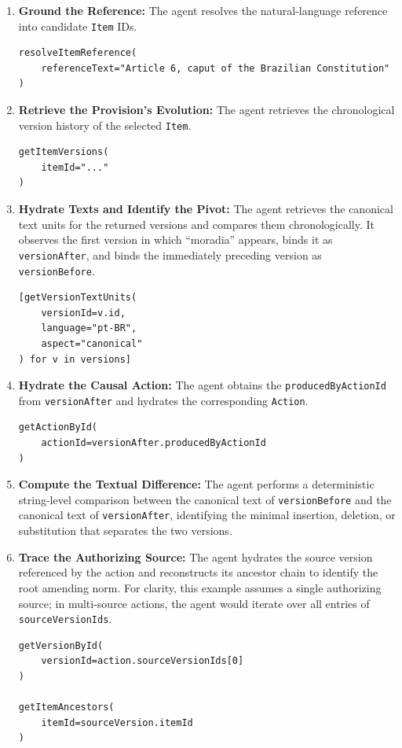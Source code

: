 \documentclass[11pt]{article}
\begin{document}
\begin{enumerate}[noitemsep, topsep=0pt]
    \item \textbf{Ground the Reference:} The agent resolves the natural-language reference into candidate \texttt{Item} IDs.
    \begin{lstlisting}[style=tablecode]
resolveItemReference(
    referenceText="Article 6, caput of the Brazilian Constitution"
)
    \end{lstlisting}

    \item \textbf{Retrieve the Provision's Evolution:} The agent retrieves the chronological version history of the selected \texttt{Item}.
    \begin{lstlisting}[style=tablecode]
getItemVersions(
    itemId="..."
)
    \end{lstlisting}

    \item \textbf{Hydrate Texts and Identify the Pivot:} The agent retrieves the canonical text units for the returned versions and compares them chronologically. It observes the first version in which ``moradia'' appears, binds it as \texttt{versionAfter}, and binds the immediately preceding version as \texttt{versionBefore}.
    \begin{lstlisting}[style=tablecode]
[getVersionTextUnits(
    versionId=v.id,
    language="pt-BR",
    aspect="canonical"
) for v in versions]
    \end{lstlisting}

    \item \textbf{Hydrate the Causal Action:} The agent obtains the \texttt{producedByActionId} from \texttt{versionAfter} and hydrates the corresponding \texttt{Action}.
    \begin{lstlisting}[style=tablecode]
getActionById(
    actionId=versionAfter.producedByActionId
)
    \end{lstlisting}

    \item \textbf{Compute the Textual Difference:} The agent performs a deterministic string-level comparison between the canonical text of \texttt{versionBefore} and the canonical text of \texttt{versionAfter}, identifying the minimal insertion, deletion, or substitution that separates the two versions.
    
    \item \textbf{Trace the Authorizing Source:} The agent hydrates the source version referenced by the action and reconstructs its ancestor chain to identify the root amending norm. For clarity, this example assumes a single authorizing source; in multi-source actions, the agent would iterate over all entries of \texttt{sourceVersionIds}.
    \begin{lstlisting}[style=tablecode]
getVersionById(
    versionId=action.sourceVersionIds[0]
)

getItemAncestors(
    itemId=sourceVersion.itemId
)
    \end{lstlisting}
\end{enumerate}
\end{document}

